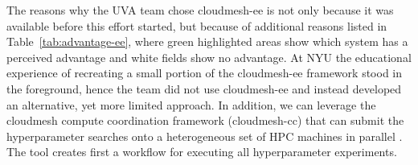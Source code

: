 \documentclass[sigplan,screen]{acmart}
\begin{document}
The reasons why the UVA team chose cloudmesh-ee is not only because it was available before this effort started, but because of additional reasons listed in Table~\ref{tab:advantage-ee}, where green highlighted areas show which system has a perceived advantage and white fields show no advantage. At NYU the educational experience of recreating a small portion of the cloudmesh-ee framework stood in the foreground, hence the team did not use cloudmesh-ee and instead developed an alternative, yet more  limited approach.
In addition, we can leverage the cloudmesh compute coordination framework (cloudmesh-cc) that can submit the hyperparameter searches onto a heterogeneous set of HPC machines in parallel \cite{las-2023-ai-workflow,github-cloudmesh-cc,las22-cloudmesh-cc-reu}. The tool creates first a workflow for executing all hyperparameter experiments.


\newcommand{\OK}{\cellcolor{green!10}}
\newcommand{\GR}{\cellcolor{gray!10}}
\end{document}
